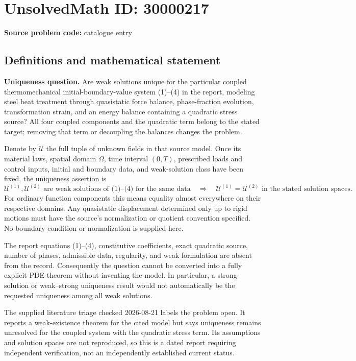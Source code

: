 \documentclass[11pt]{article}
\begin{document}
\section*{UnsolvedMath ID: 30000217}
\textbf{Source problem code:} catalogue entry
\subsection{Definitions and mathematical statement}
\textbf{Uniqueness question.} Are weak solutions unique for the particular coupled thermomechanical initial-boundary-value system (1)--(4) in the report, modeling steel heat treatment through quasistatic force balance, phase-fraction evolution, transformation strain, and an energy balance containing a quadratic stress source? All four coupled components and the quadratic term belong to the stated target; removing that term or decoupling the balances changes the problem.\par Denote by \(\mathcal U\) the full tuple of unknown fields in that source model. Once its material laws, spatial domain \(\Omega\), time interval \((0,T)\), prescribed loads and control inputs, initial and boundary data, and weak-solution class have been fixed, the uniqueness assertion is\[\mathcal U^{(1)},\mathcal U^{(2)}\text{ are weak solutions of (1)--(4) for the same data}\quad\Longrightarrow\quad\mathcal U^{(1)}=\mathcal U^{(2)}\text{ in the stated solution spaces}.\] For ordinary function components this means equality almost everywhere on their respective domains. Any quasistatic displacement determined only up to rigid motions must have the source's normalization or quotient convention specified. No boundary condition or normalization is supplied here.\par The report equations (1)--(4), constitutive coefficients, exact quadratic source, number of phases, admissible data, regularity, and weak formulation are absent from the record. Consequently the question cannot be converted into a fully explicit PDE theorem without inventing the model. In particular, a strong-solution or weak--strong uniqueness result would not automatically be the requested uniqueness among all weak solutions.\par The supplied literature triage checked 2026-08-21 labels the problem open. It reports a weak-existence theorem for the cited model but says uniqueness remains unresolved for the coupled system with the quadratic stress term. Its assumptions and solution spaces are not reproduced, so this is a dated report requiring independent verification, not an independently established current status.
\end{document}
